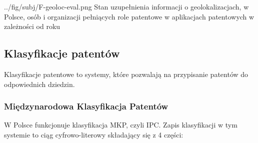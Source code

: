   \newpage
\figside
{../fig/subj/F-geoloc-eval.png}
{ Stan uzupełnienia informacji o geolokalizacjach, w Polsce, 
  osób i organizacji pełniących role patentowe
  w aplikacjach patentowych w zależności od roku}








  \newpage\subsection
{Klasyfikacje patentów}

Klasyfikacje patentowe to systemy, które pozwalają na przypisanie
patentów do odpowiednich dziedzin.



  \subsubsection
{Międzynarodowa Klasyfikacja Patentów}
\label{IPC}

W Polsce funkcjonuje klasyfikacja
\ac{MKP}, czyli \ac{IPC}. Zapis klasyfikacji w tym systemie to ciąg
cyfrowo-literowy składający się z 4 części:




